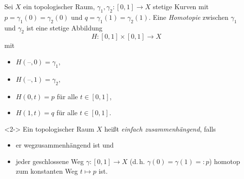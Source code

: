 \documentclass{beamer}
\newcommand{\blank}{\text{--}}
\theoremstyle{definition}
\begin{document}
\begin{frame}
  \begin{definition}
    Sei $X$ ein topologischer Raum, $\gamma_1, \gamma_2 : \left[ 0, 1 \right] \to X$ stetige Kurven mit $p = \gamma_1(0) = \gamma_2(0)$ und $q = \gamma_1(1) = \gamma_2(1)$. Eine \emph{Homotopie} zwischen $\gamma_1$ und $\gamma_2$ ist eine stetige Abbildung
    \[ H : \left[0,1\right] \times \left[0,1\right] \to X \]
    mit
    \begin{itemize}
      \item $H(\blank, 0) = \gamma_1$,
      \item $H(\blank, 1) = \gamma_2$,
      \item $H(0, t) = p$ für alle $t \in \left[0,1\right]$,
      \item $H(1, t) = q$ für alle $t \in \left[0,1\right]$.
    \end{itemize}
  \end{definition}

  \begin{definition}<2->
    Ein topologischer Raum $X$ heißt \emph{einfach zusammenhängend}, falls
    \begin{itemize}
      \item er wegzusammenhängend ist und
      \item jeder geschlossene Weg $\gamma : \left[0,1\right] \to X$ (d.\,h. $\gamma(0) = \gamma(1) =: p$) homotop zum konstanten Weg $t \mapsto p$ ist.
    \end{itemize}
  \end{definition}
\end{frame}
\end{document}
